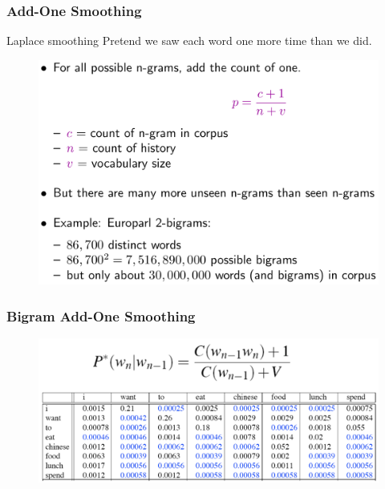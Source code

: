 \documentclass{beamer}
\begin{document}
\begin{frame}\frametitle{Add-One Smoothing}

\begin{block}{Laplace smoothing}
Pretend we saw each word one more time than we did.

\begin{figure}
\includegraphics[width=0.6\linewidth]{figure/laplace_smoothing.pdf}
\label{fig:laplace_smoothing}
\end{figure}

\end{block}
\end{frame}


\begin{frame}\frametitle{Bigram Add-One Smoothing}
\begin{figure}
\includegraphics[width=0.9\linewidth]{figure/bigram_addone_smoothing.pdf}
\label{fig:bigram_addone_smoothing}
\end{figure}

\end{frame}
\end{document}
